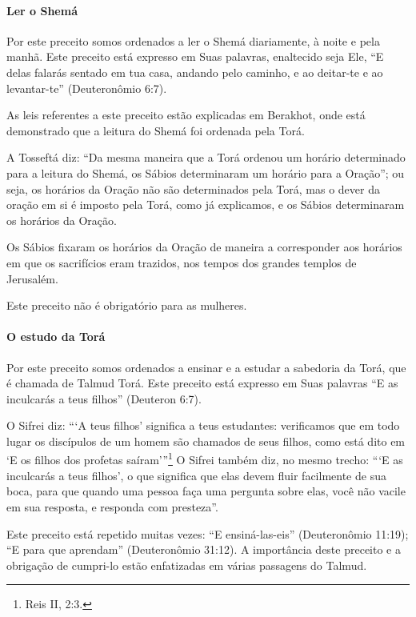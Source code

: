 \paragraph{Ler o Shemá}

Por este preceito somos ordenados a ler o Shemá diariamente, à noite e
pela manhã. Este preceito está expresso em Suas palavras, enaltecido
seja Ele, ``E delas falarás sentado em tua casa, andando pelo caminho, e
ao deitar-te e ao levantar-te'' (Deuteronômio 6:7).

As leis referentes a este preceito estão explicadas em Berakhot, onde
está demonstrado que a leitura do Shemá foi ordenada pela Torá.

A Tosseftá diz: ``Da mesma maneira que a Torá ordenou um horário
determinado para a leitura do Shemá, os Sábios determinaram um horário
para a Oração''; ou seja, os horários da Oração não são determinados
pela Torá, mas o dever da oração em si é imposto pela Torá, como já
explicamos, e os Sábios determinaram os horários da Oração.

Os Sábios fixaram os horários da Oração de maneira a corresponder aos
horários em que os sacrifícios eram trazidos, nos tempos dos grandes
templos de Jerusalém.

Este preceito não é obrigatório para as mulheres.

\paragraph{O estudo da Torá}

Por este preceito somos ordenados a ensinar e a estudar a sabedoria da
Torá, que é chamada de Talmud Torá. Este preceito está expresso em
Suas palavras ``E as inculcarás a teus filhos'' (Deuteron 6:7).

O Sifrei diz: ```A teus filhos' significa a teus estudantes: verificamos
que em todo lugar os discípulos de um homem são chamados de seus filhos,
como está dito em `E os filhos dos profetas saíram'''\footnote{Reis II, 2:3.} O Sifrei também diz,
no mesmo trecho: ```E as inculcarás a teus filhos', o que significa que
elas devem fluir facilmente de sua boca, para que quando uma pessoa faça uma
pergunta sobre elas, você não vacile em sua resposta, e responda com
presteza''.

Este preceito está repetido muitas vezes: ``E ensiná-las-eis''
(Deuteronômio 11:19); ``E para que aprendam'' (Deuteronômio 31:12). A
importância deste preceito e a obrigação de cumpri-lo estão enfatizadas
em várias passagens do Talmud.

